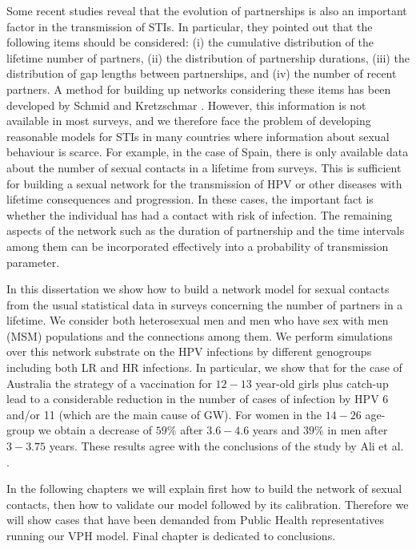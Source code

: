 Some recent studies reveal that the evolution of partnerships is also an important factor in the transmission of
STIs. In particular, they pointed out that the following items should be considered: (i) the cumulative distribution of the lifetime number of partners, (ii) the distribution of partnership durations, (iii) the distribution of gap lengths between partnerships, and (iv) the number of recent partners. A method for building up networks considering these items has been developed by Schmid and Kretzschmar \cite{schmid2012determinants}. However, this information is not available in most surveys, and we therefore face the problem of developing reasonable models for STIs in many countries where information about sexual behaviour is scarce. For example, in the case of Spain, there is only available data about the number of sexual contacts in a lifetime from surveys. This is sufficient for building a sexual network for the transmission of HPV or other diseases with lifetime consequences and progression. In these cases, the important fact is whether the individual has had a contact with risk of infection. The remaining aspects of the network such as the duration of partnership and the time intervals among them can be incorporated effectively into a probability of transmission parameter.

In this dissertation we show how to build a network model for sexual contacts from the usual statistical data in surveys concerning the number of partners in a lifetime. We consider both heterosexual men and men who have sex with men (MSM) populations and the connections among them. We perform simulations over this network substrate on the HPV infections by different genogroups including both LR and HR infections. In particular, we show that for the case of Australia the strategy of a vaccination for $12-13$ year-old girls plus catch-up lead to a considerable reduction in the number of cases of infection by HPV 6 and/or 11 (which are the main cause of GW). For women in the $14-26$ age-group we obtain a decrease of $59\%$ after $3.6-4.6$ years and $39\%$ in men after $3-3.75$ years. These results agree with the conclusions of the study by Ali et al. \cite{ali2013genital}.

In the following chapters we will explain first how to build the network of sexual contacts, then how to validate our model followed by its calibration. Therefore we will show cases that have been demanded from Public Health representatives running our VPH model. Final chapter is dedicated to conclusions.

